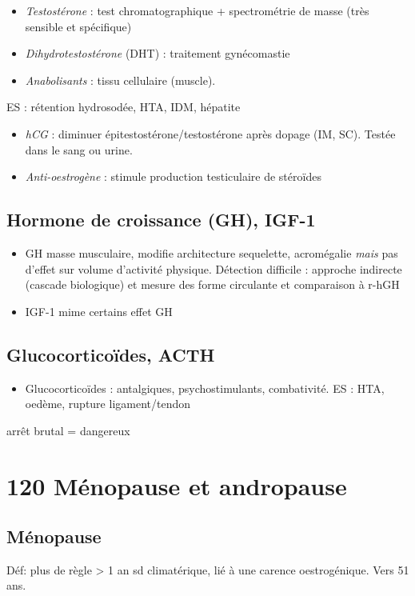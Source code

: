 \documentclass{book}
\begin{document}
\vspace*{0.5cm}
\begin{itemize}
\item \emph{Testostérone} : test chromatographique + spectrométrie de masse (très sensible
et spécifique)
\item \emph{Dihydrotestostérone} (DHT) : traitement gynécomastie
\item \emph{Anabolisants} : \inc tissu cellulaire (muscle).
\end{itemize}
ES : rétention hydrosodée, HTA, IDM, hépatite
\begin{itemize}
\item \emph{hCG} : diminuer épitestostérone/testostérone après dopage (IM, SC). Testée dans
le sang ou urine.
\item \emph{Anti-oestrogène} : stimule production testiculaire de stéroïdes
\end{itemize}

\subsection{Hormone de croissance (GH), IGF-1}
\label{sec:orgc611504}
\begin{itemize}
\item GH \inc masse musculaire, modifie architecture sequelette, acromégalie \emph{mais}
pas d'effet sur volume d'activité physique. Détection difficile : approche
indirecte (cascade biologique) et mesure des forme circulante et comparaison à r-hGH
\item IGF-1 mime certains effet GH
\end{itemize}

\subsection{Glucocorticoïdes, ACTH}
\label{sec:org16d7509}
\begin{itemize}
\item Glucocorticoïdes : antalgiques, psychostimulants, combativité. ES : HTA,
oedème, rupture ligament/tendon
\end{itemize}
\danger arrêt brutal = dangereux \faBomb

\section{120 \textdagger{} Ménopause et andropause}
\label{sec:org575acce}
\label{sec:120}
\subsection{Ménopause}
\label{sec:org141ab69}
Déf: plus de règle > 1 an \textpm{} sd climatérique, lié à une carence
oestrogénique. Vers 51 ans.
\end{document}
